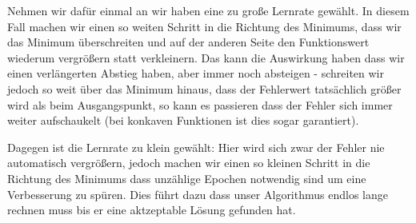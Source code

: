 \documentclass[a4paper]{article}
\begin{document}
Nehmen wir dafür einmal an wir haben eine zu große Lernrate gewählt. In diesem Fall machen wir einen so weiten Schritt in die Richtung des Minimums, dass wir das Minimum überschreiten und auf der anderen Seite den Funktionswert wiederum vergrößern statt verkleinern. Das kann die Auswirkung haben dass wir einen verlängerten Abstieg haben, aber immer noch absteigen - schreiten wir jedoch so weit über das Minimum hinaus, dass der Fehlerwert tatsächlich größer wird als beim Ausgangspunkt, so kann es passieren dass der Fehler sich immer weiter aufschaukelt (bei konkaven Funktionen ist dies sogar garantiert).

Dagegen ist die Lernrate zu klein gewählt: Hier wird sich zwar der Fehler nie automatisch vergrößern, jedoch machen wir einen so kleinen Schritt in die Richtung des Minimums dass unzählige Epochen notwendig sind um eine Verbesserung zu spüren. Dies führt dazu dass unser Algorithmus endlos lange rechnen muss bis er eine aktzeptable Lösung gefunden hat.
\end{document}
